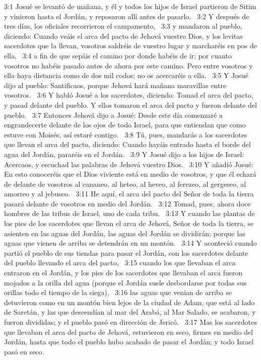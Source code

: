 3:1 Josué se levantó de mañana, y él y todos los hijos de Israel partieron de Sitim y vinieron hasta el Jordán, y reposaron allí antes de pasarlo.  
3:2 Y después de tres días, los oficiales recorrieron el campamento,  
3:3 y mandaron al pueblo, diciendo: Cuando veáis el arca del pacto de Jehová vuestro Dios, y los levitas sacerdotes que la llevan, vosotros saldréis de vuestro lugar y marcharéis en pos de ella,  
3:4 a fin de que sepáis el camino por donde habéis de ir; por cuanto vosotros no habéis pasado antes de ahora por este camino. Pero entre vosotros y ella haya distancia como de dos mil codos; no os acercaréis a ella.  
3:5 Y Josué dijo al pueblo: Santificaos, porque Jehová hará mañana maravillas entre vosotros.  
3:6 Y habló Josué a los sacerdotes, diciendo: Tomad el arca del pacto, y pasad delante del pueblo. Y ellos tomaron el arca del pacto y fueron delante del pueblo.  
3:7 Entonces Jehová dijo a Josué: Desde este día comenzaré a engrandecerte delante de los ojos de todo Israel, para que entiendan que como estuve con Moisés, así estaré contigo.  
3:8 Tú, pues, mandarás a los sacerdotes que llevan el arca del pacto, diciendo: Cuando hayáis entrado hasta el borde del agua del Jordán, pararéis en el Jordán.  
3:9 Y Josué dijo a los hijos de Israel: Acercaos, y escuchad las palabras de Jehová vuestro Dios.  
3:10 Y añadió Josué: En esto conoceréis que el Dios viviente está en medio de vosotros, y que él echará de delante de vosotros al cananeo, al heteo, al heveo, al ferezeo, al gergeseo, al amorreo y al jebuseo.  
3:11 He aquí, el arca del pacto del Señor de toda la tierra pasará delante de vosotros en medio del Jordán.  
3:12 Tomad, pues, ahora doce hombres de las tribus de Israel, uno de cada tribu.  
3:13 Y cuando las plantas de los pies de los sacerdotes que llevan el arca de Jehová, Señor de toda la tierra, se asienten en las aguas del Jordán, las aguas del Jordán se dividirán; porque las aguas que vienen de arriba se detendrán en un montón.  
3:14 Y aconteció cuando partió el pueblo de sus tiendas para pasar el Jordán, con los sacerdotes delante del pueblo llevando el arca del pacto,  
3:15 cuando los que llevaban el arca entraron en el Jordán, y los pies de los sacerdotes que llevaban el arca fueron mojados a la orilla del agua (porque el Jordán suele desbordarse por todas sus orillas todo el tiempo de la siega),  
3:16 las aguas que venían de arriba se detuvieron como en un montón bien lejos de la ciudad de Adam, que está al lado de Saretán, y las que descendían al mar del Arabá, al Mar Salado, se acabaron, y fueron divididas; y el pueblo pasó en dirección de Jericó.  
3:17 Mas los sacerdotes que llevaban el arca del pacto de Jehová, estuvieron en seco, firmes en medio del Jordán, hasta que todo el pueblo hubo acabado de pasar el Jordán; y todo Israel pasó en seco.  
